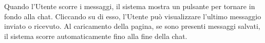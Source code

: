  \label{sec:scorrimento-chat}

\par Quando l'Utente scorre i messaggi, il sistema mostra un pulsante per tornare in fondo alla chat. Cliccando su di esso, l'Utente può visualizzare l'ultimo messaggio inviato o ricevuto. Al caricamento della pagina, se sono presenti messaggi salvati, il sistema scorre automaticamente fino alla fine della chat.
